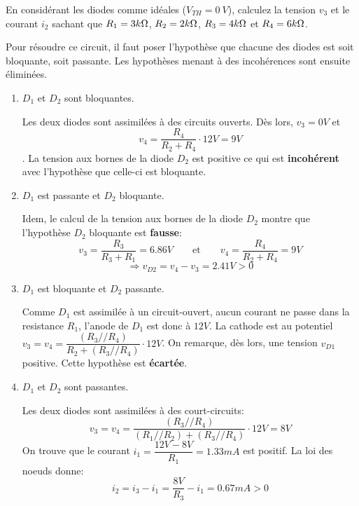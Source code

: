 \documentclass{../template/tp}
\begin{document}
\Question
{
    En considérant les diodes comme idéales ($ V_{TH} = 0~V $), calculez la tension $ v_{3} $ et le courant $ i_{2} $ sachant que $ R_{1} = 3k\ohm $, $ R_{2} = 2k\ohm $, $ R_{3} = 4k\ohm $ et $ R_{4} = 6k\ohm $.
}
{
    Pour résoudre ce circuit, il faut poser l'hypothèse que chacune des diodes est soit bloquante, soit passante. Les hypothèses menant à des incohérences sont ensuite  éliminées. 

  \begin{enumerate}
      \item $ D_{1} $ et $ D_{2} $ sont bloquantes.

      Les deux diodes sont assimilées à des circuits ouverts.
      Dès lors, $ v_{3} = 0V $ et $$ v_{4} = \dfrac{ R_{4} }{ R_{2} + R_{4}} \cdot 12V = 9V$$.
      La tension aux bornes de la diode $ D_{2} $ est positive ce qui est \textbf{incohérent} avec l'hypothèse que celle-ci est bloquante.

      \item $ D_{1} $ est passante et $ D_{2} $ bloquante.

      Idem, le calcul de la tension aux bornes de la diode $ D_{2} $ montre que l'hypothèse $ D_{2} $ bloquante est \textbf{fausse}:
      $$ v_{3} = \frac{ R_{3} }{ R_{3} + R_{1} } = 6.86V \qquad\text{et}\qquad  v_{4} = \frac{ R_{4} }{ R_{2} + R_{4} } = 9V $$
      $$ \Rightarrow v_{D2} = v_{4} - v_{3} = 2.41V > 0 $$

      \item $ D_{1} $ est bloquante et $ D_{2} $ passante.

      Comme $ D_{1} $ est assimilée à un circuit-ouvert, aucun courant ne passe dans la resistance $ R_{1} $, l'anode de $ D_{1} $ est donc à $ 12V $.
      La cathode est au potentiel $ v_{3} = v_{4} = \dfrac{ ( R_{3} // R_{4} ) }{ R_{2} + ( R_{3} // R_{4} ) } \cdot 12V $. 
      On remarque, dès lors, une tension $v_{D1}$ positive. 
      Cette hypothèse est \textbf{écartée}.

      \item $ D_{1} $ et $ D_{2} $ sont passantes.

       Les deux diodes sont assimilées à des court-circuits:
      $$ v_{3} = v_{4} = \dfrac{ ( R_{3} // R_{4} ) }{ ( R_{1} // R_{2} ) + ( R_{3} // R_{4} ) } \cdot 12V = \boxed{8V} $$
      On trouve que le courant $ i_{1} = \dfrac{ 12V - 8V }{ R_{1} } = 1.33mA $ est positif. La loi des noeuds donne:
      $$ i_{2} = i_{3} - i_{1} = \frac{ 8V }{ R_{3} } -i_{1} = \boxed{0.67mA} > 0 $$

  \end{enumerate}

}
\end{document}
